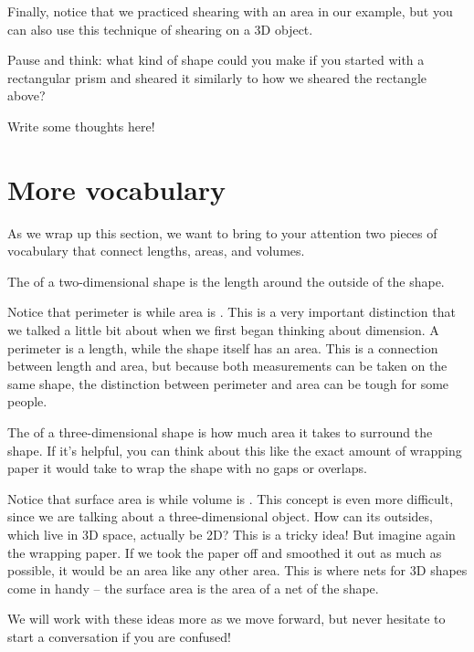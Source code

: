 \documentclass{ximera}
\begin{document}
Finally, notice that we practiced shearing with an area in our example, but you can also use this technique of shearing on a 3D object.
\begin{question}
Pause and think: what kind of shape could you make if you started with a rectangular prism and sheared it similarly to how we sheared the rectangle above?
\begin{freeResponse}
Write some thoughts here!
\end{freeResponse}
\end{question}




\section{More vocabulary}

As we wrap up this section, we want to bring to your attention two pieces of vocabulary that connect lengths, areas, and volumes.
\begin{definition}
The  of a two-dimensional shape is the length around the outside of the shape.
\end{definition}

Notice that perimeter is  while area is . This is a very important distinction that we talked a little bit about when we first began thinking about dimension. A perimeter is a length, while the shape itself has an area. This is a connection between length and area, but because both measurements can be taken on the same shape, the distinction between perimeter and area can be tough for some people.

\begin{definition}
The  of a three-dimensional shape is how much area it takes to surround the shape. If it's helpful, you can think about this like the exact amount of wrapping paper it would take to wrap the shape with no gaps or overlaps.
\end{definition}
Notice that surface area is  while volume is . This concept is even more difficult, since we are talking about a three-dimensional object. How can its outsides, which live in 3D space, actually be 2D? This is a tricky idea! But imagine again the wrapping paper. If we took the paper off and smoothed it out as much as possible, it would be an area like any other area. This is where nets for 3D shapes come in handy -- the surface area is the area of a net of the shape.

We will work with these ideas more as we move forward, but never hesitate to start a conversation if you are confused!
\end{document}
